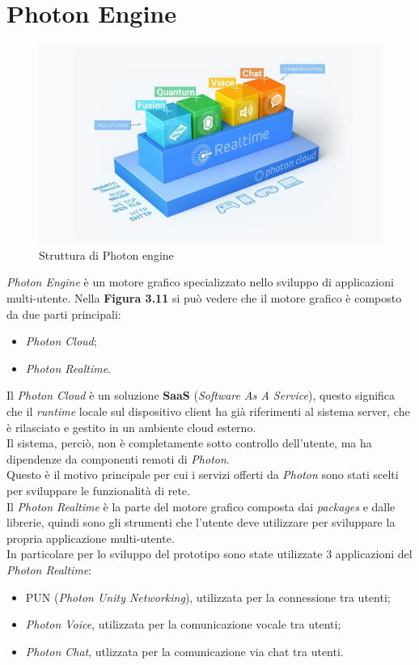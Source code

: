 \section{Photon Engine}
\begin{figure}[H]
    \centering
    \includegraphics[scale = 0.7]{Immagini/PhotonStructure.jpg}
    \caption{Struttura di Photon engine}
    \label{fig:my_label}
\end{figure}
\textit{Photon Engine\cite{Photon}} è un motore grafico specializzato nello sviluppo di applicazioni multi-utente.
Nella \textbf{Figura 3.11} si può vedere che il motore grafico è composto da due parti principali:
\begin{itemize}
    \item \textit{Photon Cloud};
    \item \textit{Photon Realtime}.
\end{itemize}
Il \textit{Photon Cloud} è un soluzione \textbf{SaaS} (\textit{Software As A Service}), questo significa che il \textit{\gls{runtime}} locale sul dispositivo client ha già riferimenti al sistema server, che è rilasciato e gestito in un ambiente cloud esterno. \\Il sistema, perciò, non è completamente sotto controllo dell'utente, ma ha dipendenze da componenti remoti di \textit{Photon}.
\\Questo è il motivo principale per cui i servizi offerti da \textit{Photon} sono stati scelti per sviluppare le funzionalità di rete.
\\Il \textit{Photon Realtime} è la parte del motore grafico composta dai \textit{packages} e dalle librerie, quindi sono gli strumenti che l'utente deve utilizzare per sviluppare la propria applicazione multi-utente.
\\In particolare per lo sviluppo del prototipo sono state utilizzate 3 applicazioni del \textit{Photon Realtime}:
\begin{itemize}
    \item PUN (\textit{Photon Unity Networking}), utilizzata per la connessione tra utenti;
    \item \textit{Photon Voice}, utilizzata per la comunicazione vocale tra utenti;
    \item \textit{Photon Chat}, utlizzata per la comunicazione via chat tra utenti.
\end{itemize}
